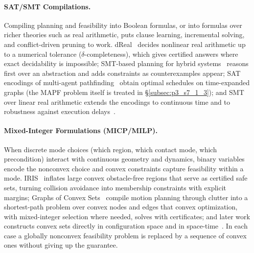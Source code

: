 \paragraph{SAT/SMT Compilations.}
Compiling planning and feasibility into Boolean formulas, or into formulas over richer theories such as real arithmetic, puts clause learning, incremental solving, and conflict-driven pruning to work. dReal~\cite{Gao2013dReal} decides nonlinear real arithmetic up to a numerical tolerance ($\delta$-completeness), which gives certified answers where exact decidability is impossible; SMT-based planning for hybrid systems~\cite{Shoukry2016SMTPlanning} reasons first over an abstraction and adds constraints as counterexamples appear; SAT encodings of multi-agent pathfinding~\cite{Surynek2016SATMAPF} obtain optimal schedules on time-expanded graphs (the MAPF problem itself is treated in §\ref{subsec:p3_s7_1_3}); and SMT over linear real arithmetic extends the encodings to continuous time and to robustness against execution delays~\cite{Kolarik2023MAPFSMT,Tan2024RobustMAPF}.

\paragraph{Mixed-Integer Formulations (MICP/MILP).}
When discrete mode choices (which region, which contact mode, which precondition) interact with continuous geometry and dynamics, binary variables encode the nonconvex choice and convex constraints capture feasibility within a mode. IRIS~\cite{Deits2014IRIS} inflates large convex obstacle-free regions that serve as certified safe sets, turning collision avoidance into membership constraints with explicit margins; Graphs of Convex Sets~\cite{Marcucci2024GCSShortest} compile motion planning through clutter into a shortest-path problem over convex nodes and edges that convex optimization, with mixed-integer selection where needed, solves with certificates; and later work constructs convex sets directly in configuration space and in space-time~\cite{Marcucci2023SciRobotics,Dai2024CIRIS}. In each case a globally nonconvex feasibility problem is replaced by a sequence of convex ones without giving up the guarantee.

